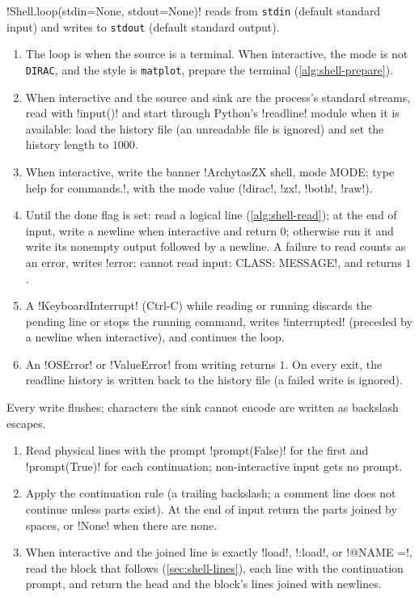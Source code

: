 \begin{algorithm}\label{alg:shell-loop}
\leavevmode
\py!Shell.loop(stdin=None, stdout=None)! reads from \texttt{stdin} (default standard input) and writes to \texttt{stdout} (default standard output).
\begin{enumerate}
\item The loop is  when the source is a terminal. When interactive, the mode is not \texttt{DIRAC}, and the style is \texttt{matplot}, prepare the terminal (\cref{alg:shell-prepare}).
\item When interactive and the source and sink are the process's standard streams, read with \py!input()! and start  through Python's \py!readline! module when it is available: load the history file  (an unreadable file is ignored) and set the history length to $1000$.
\item When interactive, write the banner \code!ArchytasZX shell, mode MODE; type help for commands.!, with the mode value (\code!dirac!, \code!zx!, \code!both!, \code!raw!).
\item Until the done flag is set: read a logical line (\cref{alg:shell-read}); at the end of input, write a newline when interactive and return $0$; otherwise run it and write its nonempty output followed by a newline. A failure to read counts as an error, writes \code!error: cannot read input: CLASS: MESSAGE!, and returns $1$.
\item A \py!KeyboardInterrupt! (Ctrl-C) while reading or running discards the pending line or stops the running command, writes \code!interrupted! (preceded by a newline when interactive), and continues the loop.
\item An \py!OSError! or \py!ValueError! from writing returns $1$. On every exit, the readline history is written back to the history file (a failed write is ignored).
\end{enumerate}
Every write flushes; characters the sink cannot encode are written as backslash escapes.
\end{algorithm}

\begin{algorithm}\label{alg:shell-read}
\leavevmode
\begin{enumerate}
\item Read physical lines with the prompt \py!prompt(False)! for the first and \py!prompt(True)! for each continuation; non-interactive input gets no prompt.
\item Apply the continuation rule (a trailing backslash; a comment line does not continue unless parts exist). At the end of input return the parts joined by spaces, or \py!None! when there are none.
\item When interactive and the joined line is exactly \azx!load!, \code!:load!, or \code!@NAME =!, read the block that follows (\cref{sec:shell-lines}), each line with the continuation prompt, and return the head and the block's lines joined with newlines.
\end{enumerate}
\end{algorithm}

